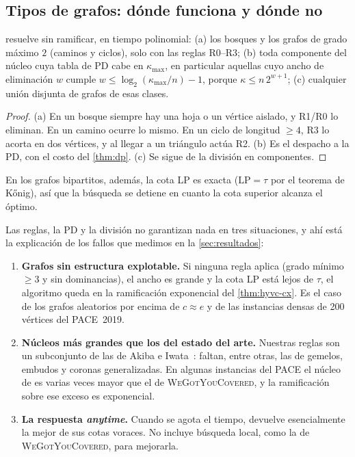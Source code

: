 \subsection{Tipos de grafos: dónde funciona y dónde no}\label{sec:hyvc-clases}
\begin{proposition}\label{prop:clases}
\hyvc{} resuelve sin ramificar, en tiempo polinomial: (a) los bosques y los grafos de grado máximo $2$ (caminos y ciclos), solo con las reglas R0--R3; (b) toda componente del núcleo cuya tabla de PD cabe en $\kappa_{\max}$, en particular aquellas cuyo ancho de eliminación $w$ cumple $w\le\log_2(\kappa_{\max}/n)-1$, porque $\kappa\le n\,2^{w+1}$; (c) cualquier unión disjunta de grafos de esas clases.
\end{proposition}
\begin{proof}
(a) En un bosque siempre hay una hoja o un vértice aislado, y R1/R0 lo eliminan. En un camino ocurre lo mismo. En un ciclo de longitud $\ge 4$, R3 lo acorta en dos vértices, y al llegar a un triángulo actúa R2. (b) Es el despacho a la PD, con el costo del \cref{thm:dp}. (c) Se sigue de la división en componentes.
\end{proof}

En los grafos bipartitos, además, la cota LP es exacta ($\mathrm{LP}=\tau$ por el teorema de Kőnig), así que la búsqueda se detiene en cuanto la cota superior alcanza el óptimo.

Las reglas, la PD y la división no garantizan nada en tres situaciones, y ahí está la explicación de los fallos que medimos en la \cref{sec:resultados}:
\begin{enumerate}
  \item \textbf{Grafos sin estructura explotable.} Si ninguna regla aplica (grado mínimo $\ge 3$ y sin dominancias), el ancho es grande y la cota LP está lejos de $\tau$, el algoritmo queda en la ramificación exponencial del \cref{thm:hyvc-cx}. Es el caso de los grafos aleatorios por encima de $c\approx e$ y de las instancias densas de 200 vértices del PACE~2019.
  \item \textbf{Núcleos más grandes que los del estado del arte.} Nuestras reglas son un subconjunto de las de Akiba e Iwata~\citep{akiba2016}: faltan, entre otras, las de gemelos, embudos y coronas generalizadas. En algunas instancias del PACE el núcleo de \hyvc{} es varias veces mayor que el de \textsc{WeGotYouCovered}, y la ramificación sobre ese exceso es exponencial.
  \item \textbf{La respuesta \emph{anytime}.} Cuando se agota el tiempo, \hyvc{} devuelve esencialmente la mejor de sus cotas voraces. No incluye búsqueda local, como la de \textsc{WeGotYouCovered}, para mejorarla.
\end{enumerate}
